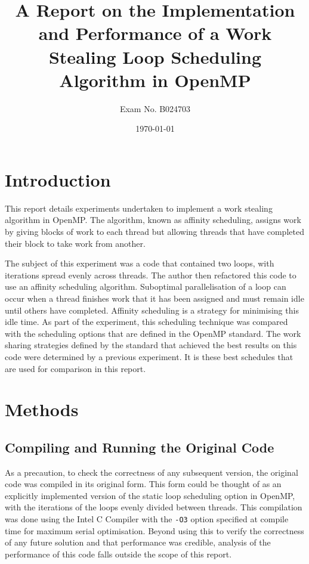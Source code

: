 \documentclass[a4paper,12pt]{article}
\begin{document}
\title{A Report on the Implementation and Performance of a Work Stealing Loop Scheduling Algorithm in OpenMP}
\author{Exam No. B024703}
\date{\today}
\maketitle

\section{Introduction}

This report details experiments undertaken to implement a work stealing algorithm in OpenMP. The algorithm, known as affinity scheduling, assigns work by giving blocks of work to each thread but allowing threads that have completed their block to take work from another.

The subject of this experiment was a code that contained two loops, with iterations spread evenly across threads. The author then refactored this code to use an affinity scheduling algorithm. Suboptimal parallelisation of a loop can occur when a thread finishes work that it has been assigned and must remain idle until others have completed. Affinity scheduling is a strategy for minimising this idle time. As part of the experiment, this scheduling technique was compared with the scheduling options that are defined in the OpenMP standard. The work sharing strategies defined by the standard that achieved the best results on this code were determined by a previous experiment. It is these best schedules that are used for comparison in this report.

\section{Methods}
\subsection{Compiling and Running the Original Code}
As a precaution, to check the correctness of any subsequent version, the original code was compiled in its original form. This form could be thought of as an explicitly implemented version of the static loop scheduling option in OpenMP, with the iterations of the loops evenly divided between threads.
This compilation was done using the Intel C Compiler with the \verb|-O3| option specified at compile time for maximum serial optimisation. Beyond using this to verify the correctness of any future solution and that performance was credible, analysis of the performance of this code falls outside the scope of this report.
\end{document}
